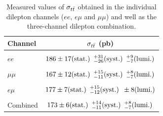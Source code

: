 \begin{table}[htdp]
  \begin{center}
    \begin{tabular}{|l|c|}\hline
      Channel & $\sigma_{\ttbar}$ (pb) \\ 
      \hline
      & \\
      $ee$      & $186 \pm 17  \textrm{(stat.)} \sp {}^{+31}_{-26} \textrm{(syst.)} \sp {}^{+9}_{-7} \textrm{(lumi.)}$ \\ 
      & \\
      $\mu\mu$  & $167 \pm 12 \textrm{(stat.)}  \sp {}^{+15}_{-11} \textrm{(syst.)} \sp {}^{+8}_{-7} \textrm{(lumi.)}$ \\ 
      & \\
      $e\mu$    & $177 \pm 7  \textrm{(stat.)}  \sp {}^{+15}_{-12} \textrm{(syst.)} \sp \pm 8        \textrm{(lumi.)}$ \\ 
      & \\
      Combined & $173 \pm 6  \textrm{(stat.)}  \sp {}^{+14}_{-11} \textrm{(syst.)} \sp {}^{+8}_{-7} \textrm{(lumi.)}$ \\
      \hline
    \end{tabular}
  \end{center}
  \caption{\label{tab:dilep_results}
    Measured values of $\sigma_{\ttbar}$ obtained in the individual dilepton channels ($ee$, $e \mu$ and $\mu \mu$) and well as the three-channel dilepton combination.}
\end{table}

